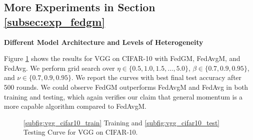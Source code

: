 \subsection{More Experiments in Section \ref{subsec:exp_fedgm}}
\label{subsec:appendix_more_results_fedgm}

\textbf{Different Model Architecture and Levels of Heterogeneity}

Figure \ref{fig:cifar10_vgg_result} shows the results for VGG on CIFAR-10 with FedGM, FedAvgM, and FedAvg. We perform grid search over $\eta\in\{0.5,1.0,1.5,\dots,5.0\}$, $\beta\in\{0.7,0.9,0.95\}$, and $\nu\in\{0.7,0.9,0.95\}$. We report the curves with best final test accuracy after 500 rounds. We could observe FedGM outperforms FedAvgM and FedAvg in both training and testing, which again verifies our claim that general momentum is a more capable algorithm compared to FedAvgM. 


\begin{figure}[h]
\vspace*{-6pt}
\centering
{}
\vspace*{-6pt}
\caption{\ref{subfig:vgg_cifar10_train} Training and \ref{subfig:vgg_cifar10_test} Testing Curve for VGG on CIFAR-10.}
\label{fig:cifar10_vgg_result}
\end{figure}


